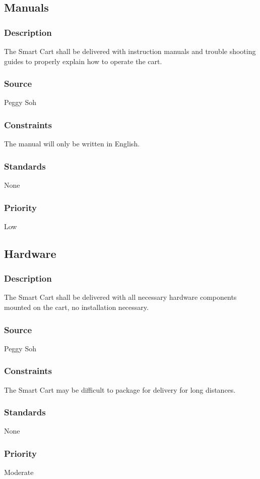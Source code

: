 \subsection{Manuals}
\subsubsection{Description}
The Smart Cart shall be delivered with instruction manuals and trouble shooting guides to properly explain how to operate the cart. 
\subsubsection{Source}
Peggy Soh
\subsubsection{Constraints}
The manual will only be written in English.
\subsubsection{Standards}
None
\subsubsection{Priority}
Low

\subsection{Hardware}
\subsubsection{Description}
The Smart Cart shall be delivered with all necessary hardware components mounted on the cart, no installation necessary. 
\subsubsection{Source}
Peggy Soh
\subsubsection{Constraints}
The Smart Cart may be difficult to package for delivery for long distances.
\subsubsection{Standards}
None
\subsubsection{Priority}
Moderate
